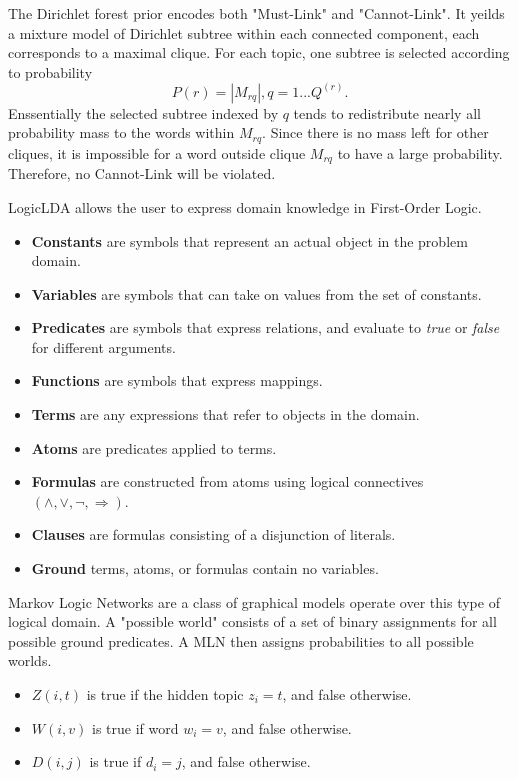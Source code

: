The Dirichlet forest prior encodes both "Must-Link" and "Cannot-Link". It yeilds a mixture model of Dirichlet subtree within each connected component, each corresponds to a maximal clique. For each topic, one subtree is selected according to probability $$P(r) = |M_{rq}|, q = 1...Q^{(r)}.$$
Enssentially the selected subtree indexed by $q$ tends to redistribute nearly all probability mass to the words within $M_{rq}$. Since there is no mass left for other cliques, it is impossible for a word outside clique $M_{rq}$ to have a large probability. Therefore, no Cannot-Link will be violated.

LogicLDA allows the user to express domain knowledge in First-Order Logic. 
\begin{itemize}
\item \textbf{Constants} are symbols that represent an actual object in the problem domain.
\item \textbf{Variables} are symbols that can take on values from the set of constants.
\item \textbf{Predicates} are symbols that express relations, and evaluate to \emph{true} or \emph{false} for different arguments.
\item \textbf{Functions} are symbols that express mappings.
\item \textbf{Terms} are any expressions that refer to objects in the domain.
\item \textbf{Atoms} are predicates applied to terms.
\item \textbf{Formulas} are constructed from atoms using logical connectives $(\wedge,\vee,\neg,\Rightarrow)$.
\item \textbf{Clauses} are formulas consisting of a disjunction of literals.
\item \textbf{Ground} terms, atoms, or formulas contain no variables.
\end{itemize}

Markov Logic Networks are a class of graphical models operate over this type of logical domain. A "possible world" consists of a set of binary assignments for all possible ground predicates. A MLN then assigns probabilities to all possible worlds. 

\begin{itemize}
\item $Z(i,t)$ is true if the hidden topic $z_i = t$, and false otherwise.
\item $W(i,v)$ is true if word $w_i = v$, and false otherwise.
\item $D(i,j)$ is true if $d_i = j$, and false otherwise.
\end{itemize}

